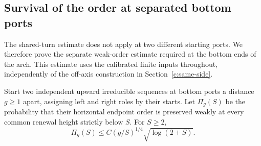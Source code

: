 \subsection{Survival of the order at separated bottom ports}
The shared-turn estimate does not apply at two different starting ports.
We therefore prove the separate weak-order estimate required at the
bottom ends of the arch. This estimate uses the calibrated finite inputs
throughout, independently of the off-axis construction in
Section~\ref{c:same-side}.

\begin{lemma}\label{c:bottom-survival}
Start two independent upward irreducible sequences at bottom ports a
distance $g\ge1$ apart, assigning left and right roles by their starts.
Let $\Pi_g(S)$ be the probability that their horizontal endpoint order
is preserved weakly at every common renewal height strictly below $S$.
For $S\ge2$,
\[
 \Pi_g(S)\le C(g/S)^{1/4}\sqrt{\log(2+S)}.
\]
\end{lemma}
